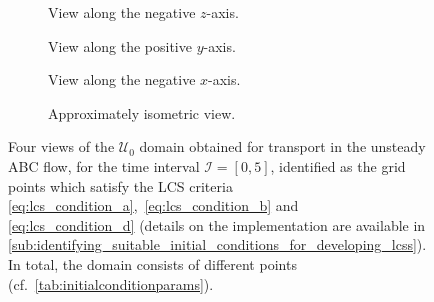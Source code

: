 \begin{figure}[htpb]
    \centering
    \hspace*{\fill}
    \begin{subfigure}[b]{0.43\textwidth}
        \centering
        \caption[]{{\small View along the negative $z$-axis.}}
        \label{fig:unsteady_abd_z}
    \end{subfigure}\hfill%
    \begin{subfigure}[b]{0.43\textwidth}
        \centering
        \caption[]{{\small View along the positive $y$-axis.}}
        \label{fig:unsteady_abd_y}
    \end{subfigure}%
    \hspace*{\fill}

    \hspace*{\fill}
    \begin{subfigure}[b]{0.43\textwidth}
        \centering
        \caption[]{{\small View along the negative $x$-axis.}}
        \label{fig:unsteady_abd_x}
    \end{subfigure}\hfill%
    \begin{subfigure}[b]{0.43\textwidth}
        \centering
        \caption[]{{\small Approximately isometric view.}}
        \label{fig:unsteady_abd_isometric}
    \end{subfigure}%
    \hspace*{\fill}
    \caption[Four views of the $\mathcal{U}_{0}$ domain obtained for transport
    in the unsteady ABC flow]
    {
        Four views of the $\mathcal{U}_{0}$ domain obtained for transport in the
        unsteady ABC flow, for the time interval $\mathcal{I}=[0,5]$,
        identified as the grid points which satisfy the LCS criteria
        \eqref{eq:lcs_condition_a},~\eqref{eq:lcs_condition_b} and~
        \eqref{eq:lcs_condition_d} (details on the implementation are available
        in
        \cref{sub:identifying_suitable_initial_conditions_for_developing_lcss}).
        In total, the domain consists of  different points
        (cf.\ \cref{tab:initialconditionparams}).
}
    \label{fig:unsteady_abd}
\end{figure}

